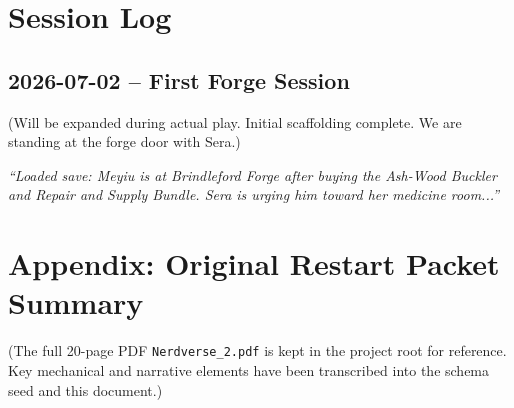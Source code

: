 \documentclass[11pt,a4paper]{article}
\begin{document}
\section{Session Log}

\subsection{2026-07-02 -- First Forge Session}

(Will be expanded during actual play. Initial scaffolding complete. We are standing at the forge door with Sera.)

\vspace{1em}
\textit{``Loaded save: Meyiu is at Brindleford Forge after buying the Ash-Wood Buckler and Repair and Supply Bundle. Sera is urging him toward her medicine room...''}

\section{Appendix: Original Restart Packet Summary}

(The full 20-page PDF \texttt{Nerdverse\_2.pdf} is kept in the project root for reference. Key mechanical and narrative elements have been transcribed into the schema seed and this document.)
\end{document}
